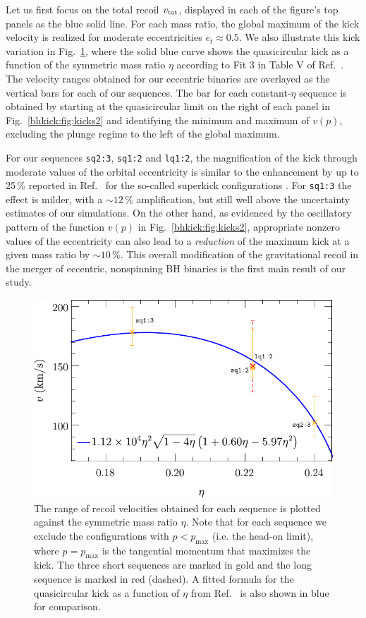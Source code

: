 Let us first focus on the total recoil $v_{\rm tot}$, displayed in each
of the figure's top panels as the blue solid line.  For each mass
ratio, the global maximum of the kick velocity is realized for
moderate eccentricities
$e_t\approx 0.5$.
We also illustrate this kick variation in
Fig.~\ref{bhkick:fig:quasicircular-fit-comparison}, where
the solid blue curve shows the
quasicircular kick as a function
of the symmetric mass ratio $\eta$ according to
Fit 3 in Table V of Ref.~\cite{Healy:2017mvh}. The velocity ranges
obtained for our eccentric binaries are
overlayed as the vertical bars for each of our sequences.
The bar for each constant-$\eta$ sequence
is obtained by starting at the quasicircular limit on the
right of each panel in Fig.~\ref{bhkick:fig:kicks2} and identifying
the minimum and maximum of $v(p)$, excluding the
plunge regime to the left of the global maximum.

For our sequences \texttt{sq2:3}, \texttt{sq1:2} and
\texttt{lq1:2}, the
magnification of the kick through moderate values
of the orbital eccentricity is similar to the
enhancement by up to 25\,\% reported in
Ref.~\cite{Sperhake:2019wwo}
for the so-called superkick configurations
\cite{Gonzalez:2007hi,Campanelli:2007cga}.
For \texttt{sq1:3} the effect is milder, with a
$\sim 12\,\%$ amplification, but still well above
the uncertainty estimates of our simulations.
On the other hand, as evidenced by the oscillatory pattern
of the function $v(p)$ in Fig.~\ref{bhkick:fig:kicks2}, appropriate
nonzero values of the eccentricity can also
lead to a {\it reduction} of the maximum kick at a given mass ratio
by $\sim 10\,\%$.
This overall modification of the gravitational recoil
in the merger of eccentric, nonspinning BH binaries
is the first main result of our study.

\begin{figure}[t]
    \centering
    \includegraphics[width=0.7\columnwidth]{bhkick/quasicircular-fit2.pdf}
    \caption{The range of recoil velocities obtained for each sequence
    is plotted against the symmetric mass ratio $\eta$. Note that for
    each sequence we exclude the configurations with
    $p<p_{\text{max}}$ (i.e. the head-on limit), where
    $p=p_{\text{max}}$ is the tangential momentum that maximizes the kick.
    The three short sequences are marked in gold and the long sequence is
    marked in red (dashed). A fitted formula for the quasicircular
    kick as a function of $\eta$ from Ref.~\cite{Healy:2017mvh} is
    also shown in blue for comparison.
    }
    \label{bhkick:fig:quasicircular-fit-comparison}
\end{figure}

